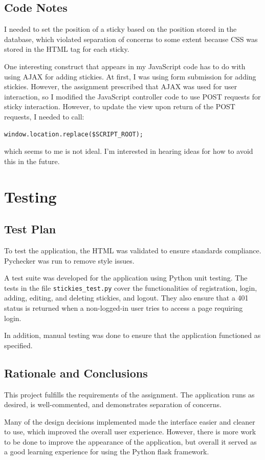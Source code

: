 \documentclass[11pt,letterpaper]{article}
\begin{document}
\subsection{Code Notes}
I needed to set the position of a sticky based on the position stored in the database, which violated separation of concerns to some extent because CSS was stored in the HTML tag for each sticky.

One interesting construct that appears in my JavaScript code has to do with using AJAX for adding stickies. At first, I was using form submission for adding stickies. However, the assignment prescribed that AJAX was used for user interaction, so I modified the JavaScript controller code to use POST requests for sticky interaction. However, to update the view upon return of the POST requests, I needed to call:
\begin{verbatim}
window.location.replace($SCRIPT_ROOT);
\end{verbatim}
which seems to me is not ideal. I'm interested in hearing ideas for how to avoid this in the future.

\section{Testing}

\subsection{Test Plan}
To test the application, the HTML was validated to ensure standards compliance. Pychecker was run to remove style issues.

A test suite was developed for the application using Python unit testing. The tests in the file \texttt{stickies\_test.py} cover the functionalities of registration, login, adding, editing, and deleting stickies, and logout. They also ensure that a 401 status is returned when a non-logged-in user tries to access a page requiring login.

In addition, manual testing was done to ensure that the application functioned as specified.

\subsection{Rationale and Conclusions}
This project fulfills the requirements of the assignment. The application runs as desired, is well-commented, and demonstrates separation of concerns.

Many of the design decisions implemented made the interface easier and cleaner to use, which improved the overall user experience. However, there is more work to be done to improve the appearance of the application, but overall it served as a good learning experience for using the Python flask framework.
\end{document}
